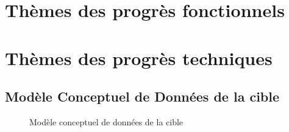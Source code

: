 

\newcommand{\mainTitle}{\'Etude préalable - SPIE}
\newcommand{\secondTitle}{Spécification du SI cible}
\newcommand{\documentRef}{DEB-SSIC/4401/1}
\newcommand{\auteurs}{
Lisa \textsc{Courant} \\
Estelle \textsc{Lepeigneux} \\
Pierre \textsc{Jarsaillon} \\
Hugues \textsc{Verlin} \\
}
\newcommand{\chefDeProjet}{Paul \textsc{Dautry}}
\newcommand{\responsableQualite}{Antoine \textsc{Chabert}}





\tableofcontents
\listoffigures
\listoftables
\newpage

\part{Thèmes des progrès fonctionnels}
\setcounter{section}{0}


\part{Thèmes des progrès techniques}
\setcounter{section}{0}



\appendix
\chapter{Modèle Conceptuel de Données de la cible}

\begin{figure}[H]
    \label{fig-mcd-cible}
    \noindent{}
    \caption{Modèle conceptuel de données de la cible}
\end{figure}

